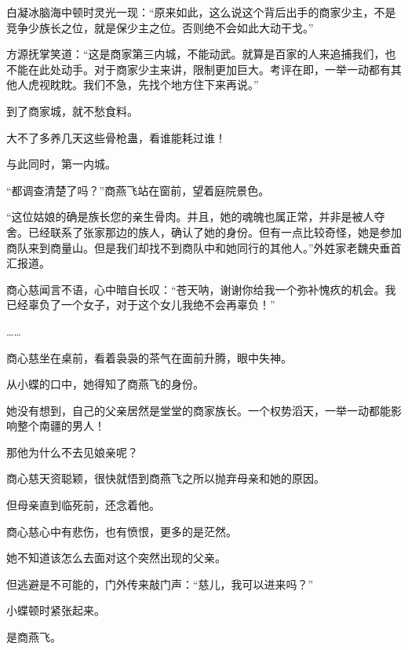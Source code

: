 \begin{this_body}
白凝冰脑海中顿时灵光一现：“原来如此，这么说这个背后出手的商家少主，不是竞争少族长之位，就是保少主之位。否则绝不会如此大动干戈。”

方源抚掌笑道：“这是商家第三内城，不能动武。就算是百家的人来追捕我们，也不能在此处动手。对于商家少主来讲，限制更加巨大。考评在即，一举一动都有其他人虎视眈眈。我们不急，先找个地方住下来再说。”

到了商家城，就不愁食料。

大不了多养几天这些骨枪蛊，看谁能耗过谁！

与此同时，第一内城。

“都调查清楚了吗？”商燕飞站在窗前，望着庭院景色。

“这位姑娘的确是族长您的亲生骨肉。并且，她的魂魄也属正常，并非是被人夺舍。已经联系了张家那边的族人，确认了她的身份。但有一点比较奇怪，她是参加商队来到商量山。但是我们却找不到商队中和她同行的其他人。”外姓家老魏央垂首汇报道。

商心慈闻言不语，心中暗自长叹：“苍天呐，谢谢你给我一个弥补愧疚的机会。我已经辜负了一个女子，对于这个女儿我绝不会再辜负！”

……

商心慈坐在桌前，看着袅袅的茶气在面前升腾，眼中失神。

从小蝶的口中，她得知了商燕飞的身份。

她没有想到，自己的父亲居然是堂堂的商家族长。一个权势滔天，一举一动都能影响整个南疆的男人！

那他为什么不去见娘亲呢？

商心慈天资聪颖，很快就悟到商燕飞之所以抛弃母亲和她的原因。

但母亲直到临死前，还念着他。

商心慈心中有悲伤，也有愤恨，更多的是茫然。

她不知道该怎么去面对这个突然出现的父亲。

但逃避是不可能的，门外传来敲门声：“慈儿，我可以进来吗？”

小蝶顿时紧张起来。

是商燕飞。

\end{this_body}

